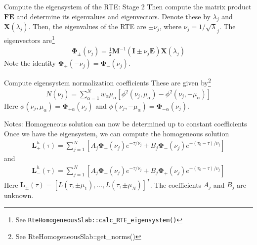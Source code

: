 \documentclass[14]{beamer}
\newcommand{\mvec}[1]{\mathbf{#1}}
\newcommand{\gvec}[1]{\boldsymbol{#1}}
\begin{document}
\begin{frame}{Compute the eigensystem of the RTE: Stage 2}
  Then compute the matrix product $\mvec{F}\mvec{E}$ and determine its
  eigenvalues and eigenvectors. Denote these by $\lambda_j$ and
  $\mvec{X}(\lambda_j)$.  Then, the eigenvalues of the RTE are $\pm
  \nu_j$, where $\nu_j = 1/\sqrt\lambda_j$. The eigenvectors
  are\footnote{See {\tt RteHomogeneousSlab::calc\_RTE\_eigensystem()}}
  \begin{align}
    \gvec{\Phi}_\pm (\nu_j)
    = \frac{1}{2}\mvec{M}^{-1}
    (\mvec{I} \pm \nu_j\mvec{E})\mvec{X}(\lambda_j)
  \end{align}
  Note the identity $\gvec{\Phi}_+(-\nu_j) =
  \gvec{\Phi}_-(\nu_j)$.
\end{frame}

\begin{frame}{Compute eigensystem normalization coefficients}
  These are given by\footnote{See RteHomogeneousSlab::get\_norms()}
  \begin{align}
    N(\nu_j) = \sum_{\alpha=1}^N
    w_\alpha \mu_\alpha
    \left[
      \phi^2(\nu_j,\mu_\alpha) - \phi^2(\nu_j,-\mu_\alpha)
    \right]
  \end{align}
  Here $\phi(\nu_j,\mu_\alpha) = \gvec{\Phi}_{+\alpha}(\nu_j)$ and
  $\phi(\nu_j,-\mu_\alpha) = \gvec{\Phi}_{-\alpha}(\nu_j)$.

\end{frame}

\begin{frame}{Notes: Homogeneous solution can now be determined up to
    constant coefficients}
  Once we have the eigensystem, we can compute the homogeneous solution
  \begin{align}
    \mvec{L}^h_+(\tau) = \sum_{j=1}^N
    \left[
      A_j \gvec{\Phi}_+(\nu_j) e^{-\tau/\nu_j} +
      B_j \gvec{\Phi}_-(\nu_j) e^{-(\tau_0-\tau)/\nu_j}
    \right]
  \end{align}
  and
  \begin{align}
    \mvec{L}^h_-(\tau) = \sum_{j=1}^N
    \left[
      A_j \gvec{\Phi}_-(\nu_j) e^{-\tau/\nu_j} +
      B_j \gvec{\Phi}_+(\nu_j) e^{-(\tau_0-\tau)/\nu_j}
    \right]
  \end{align}
  Here $\mvec{L}_\pm(\tau) = [L(\tau,\pm\mu_1),\ldots,
  L(\tau,\pm\mu_N)]^T$. The coefficients $A_j$ and $B_j$ are unknown.
\end{frame}
\end{document}
